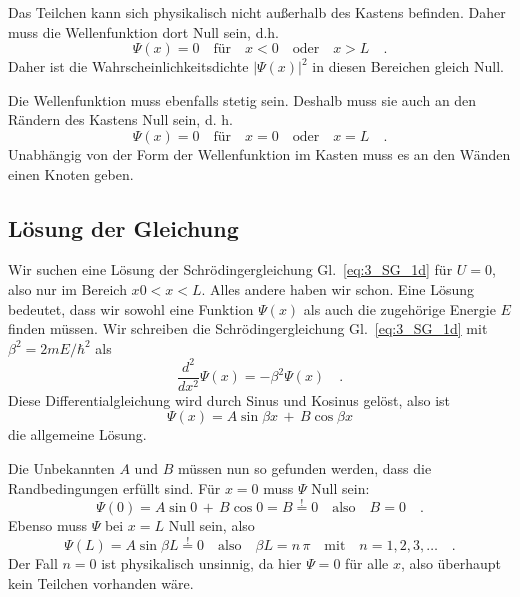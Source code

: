 Das Teilchen kann sich physikalisch nicht außerhalb des Kastens befinden. Daher muss die Wellenfunktion dort Null sein, d.h.
\begin{equation}
    \Psi(x) = 0 \quad \text{für} \quad x < 0  \quad \text{oder} \quad x > L \quad .
 \end{equation}
 Daher ist die Wahrscheinlichkeitsdichte $|\Psi(x)|^2$ in diesen Bereichen gleich Null.

Die Wellenfunktion muss ebenfalls stetig sein. Deshalb muss sie auch an den Rändern des Kastens Null sein, d. h.
\begin{equation}
    \Psi(x) = 0 \quad \text{für} \quad x = 0  \quad \text{oder} \quad x = L \quad .
 \end{equation}
 Unabhängig von der Form der Wellenfunktion im Kasten muss es an den Wänden einen Knoten geben.



\subsection{Lösung der Gleichung}

Wir suchen eine Lösung der Schrödingergleichung Gl.~\ref{eq:3_SG_1d} für $U=0$, also nur im Bereich $x0<x<L$. Alles andere haben wir schon. Eine Lösung bedeutet, dass wir sowohl eine Funktion $\Psi(x)$ als auch die zugehörige Energie $E$ finden müssen.
Wir schreiben die Schrödingergleichung Gl.~\ref{eq:3_SG_1d} mit $\beta^2 = 2 m E / \hbar^2$ als
\begin{equation}
    \frac{d^2}{dx^2} \Psi(x) = - \beta^2 \Psi(x)  \quad .
  \end{equation}
Diese Differentialgleichung wird durch Sinus und Kosinus gelöst, also ist 
\begin{equation}
    \Psi(x) = A \sin \beta x  \, + \, B \cos \beta x
\end{equation}
die allgemeine Lösung. 

Die Unbekannten $A$ und $B$ müssen nun so gefunden werden, dass die Randbedingungen erfüllt sind. Für $x=0$ muss $\Psi$ Null sein:
\begin{equation}
    \Psi(0) =  A \sin   0  \, + \, B \cos   0 = B \overset{!}{=} 0 \quad \text{also} \quad B = 0 \quad .
\end{equation}
Ebenso muss $\Psi$ bei $x=L$ Null sein, also 
\begin{equation}
    \Psi(L) = A \sin \beta L \overset{!}{=} 0 \quad \text{also} \quad \beta L = n \, \pi \quad \text{mit} \quad n = 1, 2, 3, \dots \quad .
\end{equation}
Der Fall $n=0$ ist physikalisch unsinnig, da hier $\Psi = 0$ für alle $x$, also überhaupt kein Teilchen vorhanden wäre.

